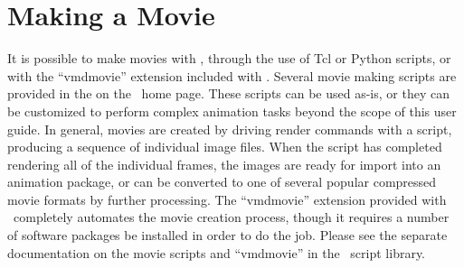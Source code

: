 \section{Making a Movie}
It is possible to make movies with \VMD, through the use of Tcl or Python
scripts, or with the ``vmdmovie'' extension included with \VMD.
Several movie making scripts are provided in the 
on the \VMD\ home page.  These scripts can be used as-is, or they can
be customized to perform complex animation tasks beyond the scope of
this user guide.  In general, movies are created by driving
render commands with a script, producing a sequence of individual
image files.  When the script has completed rendering all of the 
individual frames, the images are ready for import into an
animation package, or can be converted to one of several popular
compressed movie formats by further processing.  The ``vmdmovie'' 
extension provided with \VMD\ completely automates the movie creation
process, though it requires a number of software packages be installed
in order to do the job.  Please see the separate documentation on the 
movie scripts and ``vmdmovie'' in the \VMD\ script library.


